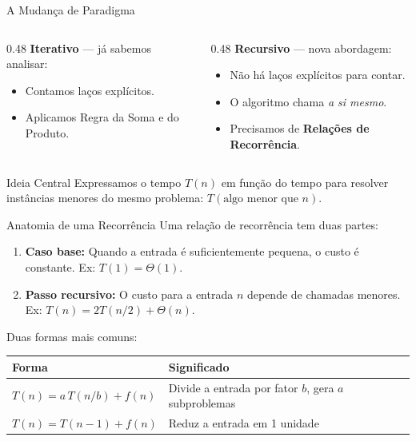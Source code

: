 \documentclass[aspectratio=169]{beamer}
\begin{document}
\begin{frame}{A Mudança de Paradigma}
    \begin{columns}[T]
    \begin{column}{0.48\textwidth}
        \textbf{Iterativo} --- já sabemos analisar:
        \begin{itemize}
            \item Contamos laços explícitos.
            \item Aplicamos Regra da Soma e do Produto.
        \end{itemize}
    \end{column}
    \begin{column}{0.48\textwidth}
        \textbf{Recursivo} --- nova abordagem:
        \begin{itemize}
            \item Não há laços explícitos para contar.
            \item O algoritmo chama \emph{a si mesmo}.
            \item Precisamos de \textbf{Relações de Recorrência}.
        \end{itemize}
    \end{column}
    \end{columns}
    
    \vspace{0.5cm}
    \begin{block}{Ideia Central}
        Expressamos o tempo $T(n)$ em função do tempo para resolver instâncias menores do mesmo problema: $T(\text{algo menor que } n)$.
    \end{block}
\end{frame}

\begin{frame}{Anatomia de uma Recorrência}
    Uma relação de recorrência tem duas partes:
    
    \vspace{0.3cm}
    \begin{enumerate}
        \item \textbf{Caso base:} Quando a entrada é suficientemente pequena, o custo é constante. Ex: $T(1) = \Theta(1)$.
        \item \textbf{Passo recursivo:} O custo para a entrada $n$ depende de chamadas menores. Ex: $T(n) = 2T(n/2) + \Theta(n)$.
    \end{enumerate}
    
    \vspace{0.25cm}
    Duas formas mais comuns:

    \begin{center}
    \renewcommand{\arraystretch}{1.3}
    \begin{tabular}{ll}
        \toprule
        \textbf{Forma} & \textbf{Significado} \\
        \midrule
        $T(n) = a\,T(n/b) + f(n)$ & Divide a entrada por fator $b$, gera $a$ subproblemas \\
        $T(n) = T(n-1) + f(n)$ & Reduz a entrada em 1 unidade \\
        \bottomrule
    \end{tabular}
    \end{center}
\end{frame}
\end{document}
